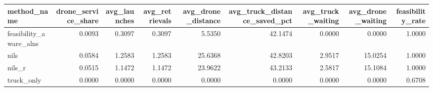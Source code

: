 \begin{tabular}{lrrrrrrrr}
\toprule
method_name & drone_service_share & avg_launches & avg_retrievals & avg_drone_distance & avg_truck_distance_saved_pct & avg_truck_waiting & avg_drone_waiting & feasibility_rate \\
\midrule
feasibility_aware_alns & 0.0093 & 0.3097 & 0.3097 & 5.5350 & 42.1474 & 0.0000 & 0.0000 & 1.0000 \\
nils & 0.0584 & 1.2583 & 1.2583 & 25.6368 & 42.8203 & 2.9517 & 15.0254 & 1.0000 \\
nils_r & 0.0515 & 1.1472 & 1.1472 & 23.9622 & 43.2133 & 2.5817 & 15.1084 & 1.0000 \\
truck_only & 0.0000 & 0.0000 & 0.0000 & 0.0000 & 0.0000 & 0.0000 & 0.0000 & 0.6708 \\
\bottomrule
\end{tabular}
